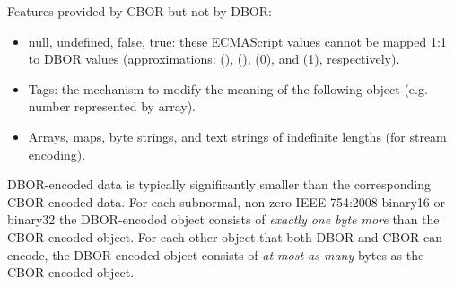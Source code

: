 \begin{BeginParPenalty}
    Features provided by CBOR but not by DBOR:
    \begin{itemize}
        \item
        null, undefined, false, true:
        these ECMAScript values cannot be mapped 1:1 to DBOR values
        (approximations: \DborNoneValue(), \DborNoneValue(), \DborIntegerValue(0), and \DborIntegerValue(1),
        respectively).

        \item Tags:
        the mechanism to modify the meaning of the following object
        (e.g. number represented by array).

        \item
        Arrays, maps, byte strings, and text strings of indefinite lengths (for stream encoding).
    \end{itemize}
\end{BeginParPenalty}

DBOR-encoded data is typically significantly smaller than the corresponding CBOR encoded data.
For each subnormal, non-zero IEEE-754:2008 binary16 or binary32 the DBOR-encoded object consists of
\emph{exactly one byte more} than the CBOR-encoded object.
For each other object that both DBOR and CBOR can encode, the DBOR-encoded object consists of \emph{at most as many}
bytes as the CBOR-encoded object.

